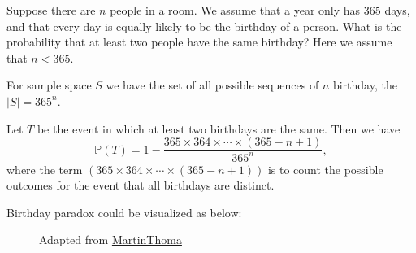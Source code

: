 \begin{eg}
    Suppose there are \(n\) people in a room. We assume that a year only has 365 days, and that every day is equally likely to be the birthday of a person. What is the probability that at least two people have the same birthday? Here we assume that \(n < 365\). 

    For sample space \(S\) we have the set of all possible sequences of \(n\) birthday, the \(\vert S \vert = 365^n\). 

    Let \(T\) be the event in which at least two birthdays are the same. Then we have
    \[
        \mathbb{P}(T) = 1 - \dfrac{365 \times 364 \times \cdots \times (365 - n + 1)}{365^n},
    \]
    where the term \((365 \times 364 \times \cdots \times (365 - n + 1))\) is to count the possible outcomes for the event that all birthdays are distinct.
\end{eg}
Birthday paradox could be visualized as below:
\begin{figure}[H]
\caption*{Adapted from \href{https://github.com/MartinThoma/LaTeX-examples/tree/2286e6e3833904b2c058b2a855db9b7f81776c59/tikz/birthday-paradox}{MartinThoma}}
\end{figure}

